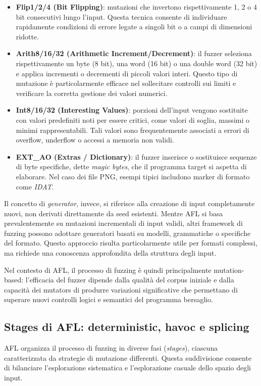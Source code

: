\begin{itemize}
    \item \textbf{Flip1/2/4 (Bit Flipping)}: mutazioni che invertono rispettivamente 1, 2 o 4 bit consecutivi lungo l’input. 
    Questa tecnica consente di individuare rapidamente condizioni di errore legate a singoli bit o a campi di dimensioni ridotte.

    \item \textbf{Arith8/16/32 (Arithmetic Increment/Decrement)}: il fuzzer seleziona rispettivamente un byte (8 bit), una word (16 bit) o una double word (32 bit) e applica incrementi o decrementi di piccoli valori interi. Questo tipo di mutazione è particolarmente efficace nel sollecitare controlli sui limiti e verificare la corretta gestione dei valori numerici.

    \item \textbf{Int8/16/32 (Interesting Values)}: porzioni dell’input vengono sostituite con valori predefiniti noti per essere critici, come valori di soglia, massimi o minimi rappresentabili. Tali valori sono frequentemente associati a errori di overflow, underflow o accessi a memoria non validi.

    \item \textbf{EXT\_AO (Extras / Dictionary)}: il fuzzer inserisce o sostituisce sequenze di byte specifiche, dette \textit{magic bytes}, che il programma target si aspetta di elaborare. 
    Nel caso dei file PNG, esempi tipici includono marker di formato come \textit{IDAT}. 
\end{itemize}

\noindent
Il concetto di \textit{generator}, invece, si riferisce alla creazione di input completamente nuovi, non derivati direttamente da seed esistenti. Mentre AFL si basa prevalentemente su mutazioni incrementali di input validi, altri framework di fuzzing possono adottare generatori basati su modelli, grammatiche o specifiche del formato. Questo approccio risulta particolarmente utile per formati complessi, ma richiede una conoscenza approfondita della struttura degli input.

\noindent
Nel contesto di AFL, il processo di fuzzing è quindi principalmente mutation-based: l’efficacia del fuzzer dipende dalla qualità del corpus iniziale e dalla capacità dei mutators di produrre variazioni significative che permettano di superare nuovi controlli logici e semantici del programma bersaglio.

\subsection{Stages di AFL: deterministic, havoc e splicing}
AFL organizza il processo di fuzzing in diverse fasi (\textit{stages}), ciascuna caratterizzata da strategie di mutazione differenti. Questa suddivisione consente di bilanciare l'esplorazione sistematica e l'esplorazione casuale dello spazio degli input.\\

